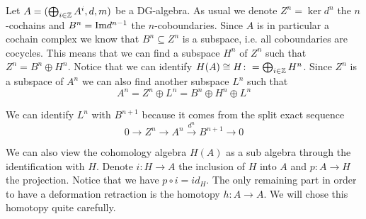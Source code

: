 Let $A=(\bigoplus_{i\in \mathbb{Z}}A^i, d, m)$ be a DG-algebra. As usual we denote $Z^n = \ker d^n$ the $n$-cochains and $B^n = \text{Im} d^{n-1}$ the $n$-coboundaries. Since $A$ is in particular a cochain complex we know that $B^n\subseteq Z^n$ is a subspace, i.e. all coboundaries are cocycles. This means that we can find a subspace $H^n$ of $Z^n$ such that $Z^n = B^n\oplus H^n$. Notice that we can identify $H(A)\cong H\colon = \bigoplus_{i\in \mathbb{Z}}H^n$. Since $Z^n$ is a subspace of $A^n$ we can also find another subspace $L^n$ such that 
\begin{equation*}
    A^n = Z^n\oplus L^n = B^n\oplus H^n\oplus L^n
\end{equation*}

We can identify $L^n$ with $B^{n+1}$ because it comes from the split exact sequence 
\begin{equation*}
    0\longrightarrow Z^n\longrightarrow A^n\overset{d^n}\longrightarrow B^{n+1}\longrightarrow 0
\end{equation*}

We can also view the cohomology algebra $H(A)$ as a sub algebra through the identification with $H$. Denote $i\colon H\longrightarrow A$ the inclusion of $H$ into $A$ and $p\colon A\longrightarrow H$ the projection. Notice that we have $p\circ i = id_H$. The only remaining part in order to have a deformation retraction is the homotopy $h\colon A\longrightarrow A$. We will chose this homotopy quite carefully. 

